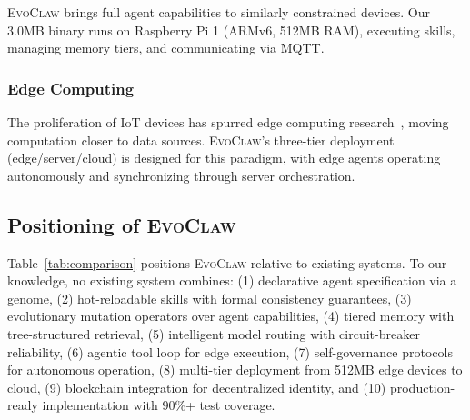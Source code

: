 \documentclass{article}
\newcommand{\evoclaw}{\textsc{EvoClaw}}
\begin{document}
\evoclaw{} brings full agent capabilities to similarly constrained devices. Our 3.0MB binary runs on Raspberry Pi 1 (ARMv6, 512MB RAM), executing skills, managing memory tiers, and communicating via MQTT.

\subsubsection{Edge Computing}

The proliferation of IoT devices has spurred edge computing research~\cite{shi2016edge}, moving computation closer to data sources. \evoclaw{}'s three-tier deployment (edge/server/cloud) is designed for this paradigm, with edge agents operating autonomously and synchronizing through server orchestration.

\subsection{Positioning of \evoclaw{}}

Table~\ref{tab:comparison} positions \evoclaw{} relative to existing systems. To our knowledge, no existing system combines: (1) declarative agent specification via a genome, (2) hot-reloadable skills with formal consistency guarantees, (3) evolutionary mutation operators over agent capabilities, (4) tiered memory with tree-structured retrieval, (5) intelligent model routing with circuit-breaker reliability, (6) agentic tool loop for edge execution, (7) self-governance protocols for autonomous operation, (8) multi-tier deployment from 512MB edge devices to cloud, (9) blockchain integration for decentralized identity, and (10) production-ready implementation with 90\%+ test coverage.
\end{document}
